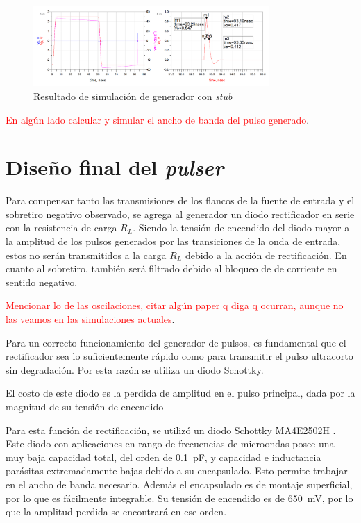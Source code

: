 \begin{figure}[tbp]
    \centering
    \includegraphics[width=0.8\textwidth]{images/stub_generator_sim_result.png}
    \caption{Resultado de simulación de generador con \textit{stub}}
    \label{fig:stub_generator_sim_result}
\end{figure}

\textcolor{red}{En algún lado calcular y simular el ancho de banda del pulso
generado}.

\section{Diseño final del \textit{pulser}}

Para compensar tanto las transmisiones de los flancos de la fuente de entrada y
el sobretiro negativo observado, se agrega al generador un diodo rectificador en
serie con la resistencia de carga $R_L$. Siendo la tensión de encendido del
diodo mayor a la amplitud de los pulsos generados por las transiciones de la
onda de entrada, estos no serán transmitidos a la carga $R_L$ debido a la acción
de rectificación. En cuanto al sobretiro, también será filtrado debido al
bloqueo de de corriente en sentido negativo.

\textcolor{red}{Mencionar lo de las oscilaciones, citar algún paper q diga q
ocurran, aunque no las veamos en las simulaciones actuales}.

Para un correcto funcionamiento del generador de pulsos, es fundamental que el
rectificador sea lo suficientemente rápido como para transmitir el pulso
ultracorto sin degradación. Por esta razón se utiliza un diodo Schottky.

El costo de este diodo es la perdida de amplitud en el pulso principal, dada por
la magnitud de su tensión de encendido

Para esta función de rectificación, se utilizó un diodo Schottky MA4E2502H
\cite{MA4E2502H-datasheet}. Este diodo con aplicaciones en rango de frecuencias
de microondas posee una muy baja capacidad total, del orden de
\qty{0.1}{\pico\farad}, y capacidad e inductancia parásitas extremadamente bajas
debido a su encapsulado. Esto permite trabajar en el ancho de banda necesario.
Además el encapsulado es de montaje superficial, por lo que es fácilmente
integrable. Su tensión de encendido es de \qty{650}{\milli\volt}, por lo que la
amplitud perdida se encontrará en ese orden.


